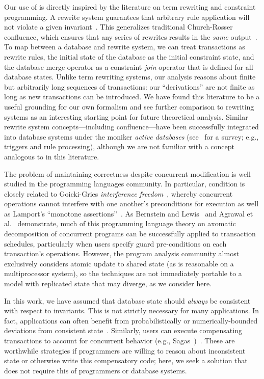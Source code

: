  Our use of \iconfluence is directly inspired
by the literature on term rewriting and constraint programming. A
\iconfluent rewrite system guarantees that arbitrary rule application
will not violate a given invariant~\cite{obs-confluence}. This
generalizes traditional Church-Rosser confluence, which ensures that
any series of rewrites results in the \textit{same}
output~\cite{termrewriting}. To map between a database and rewrite
system, we can treat transactions as rewrite rules, the initial state
of the database as the initial constraint state, and the database
merge operator as a constraint \textit{join} operator that is defined
for all database states. Unlike term rewriting systems, our \cfreedom
analysis reasons about finite but arbitrarily long sequences of
transactions: our ``derivations'' are not finite as long as new
transactions can be introduced. We have found this literature to be a
useful grounding for our own formalism and see further comparison to
rewriting systems as an interesting starting point for future
theoretical analysis. Similar rewrite system concepts---including
confluence---have been successfully integrated into database systems
under the moniker \textit{active databases} (see~\cite{activedb-book}
for a survey; e.g., triggers and rule processing), although we are not
familiar with a concept analogous to \iconfluence in this literature.

 The problem of maintaining correctness
despite concurrent modification is well studied in the programming
languages community. In particular, \iconfluence condition is closely
related to Goicki-Gries \textit{interference
  freedom}~\cite{owickigries}, whereby concurrent operations cannot
interfere with one another's preconditions for execution as well as
Lamport's ``monotone assertions''~\cite{lamport-correctness}. As
Bernstein and Lewis~\cite{decomp-semantics} and Agrawal et
al.~\cite{agarwal-consistency} demonstrate, much of this programming
language theory on axomatic decomposition of concurrent programs can
be successfully applied to transaction schedules, particularly when
users specify guard pre-conditions on each transaction's
operations. However, the program analysis community almost exclusively
considers atomic update to shared state (as is reasonable on a
multiprocessor system), so the techniques are not immediately portable
to a model with replicated state that may diverge, as we consider
here.

 In this work, we have assumed that
database state should \textit{always} be consistent with respect to
invariants. This is not strictly necessary for many applications. In
fact, applications can often benefit from probabilistically or
numerically-bounded deviations from consistent
state~\cite{epsilon-divergence}. Similarly, users can execute
compensating transactions to account for concurrent behavior (e.g.,
Sagas~\cite{sagas})~\cite{ic-survey,ic-survey-two}. These are worthwhile
strategies if programmers are willing to reason about inconsistent
state or otherwise write this compensatory code; here,
we seek a solution that does not require this of programmers or
database systems.

